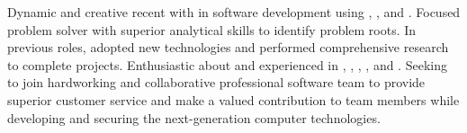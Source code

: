 

\begin{cvparagraph}

Dynamic and creative recent  with  in software development using , ,  and . Focused problem solver with superior analytical skills to identify problem roots. In previous roles, adopted new technologies and performed comprehensive research to complete projects. Enthusiastic about and experienced in , , , ,  and . Seeking to join \putcompanynamewiths hardworking and collaborative professional software team to provide superior customer service and make a valued contribution to team members  while developing and securing the next-generation computer technologies.
\end{cvparagraph}
